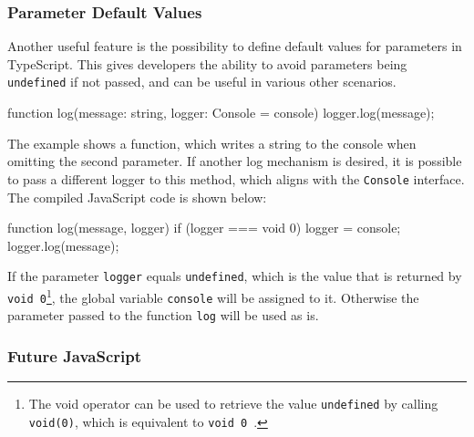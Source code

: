 \subsubsection{Parameter Default Values}

Another useful feature is the possibility to define default values for parameters in TypeScript. This gives developers the ability to avoid parameters being \texttt{undefined} if not passed, and can be useful in various other scenarios.
\begin{JsCode}[numbers=none]
function log(message: string, logger: Console = console) {
  logger.log(message);
}
\end{JsCode}
The example shows a function, which writes a string to the console when omitting the second parameter. If another log mechanism is desired, it is possible to pass a different logger to this method, which aligns with the \texttt{Console} interface. The compiled JavaScript code is shown below:
\begin{JsCode}[numbers=none]
function log(message, logger) {
    if (logger === void 0) { logger = console; }
    logger.log(message);
}
\end{JsCode}
If the parameter \texttt{logger} equals \texttt{undefined}, which is the value that is returned by \mbox{\texttt{void 0}}\footnote{The void operator can be used to retrieve the value \texttt{undefined} by calling \texttt{void(0)}, which is equivalent to \texttt{void 0}~\cite{void:MDN:2017}.}, the global variable \texttt{console} will be assigned to it. Otherwise the parameter passed to the function \texttt{log} will be used as is.

\enlargethispage{1\baselineskip}
\subsubsection{Future JavaScript}

